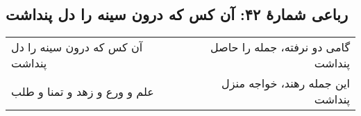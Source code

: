 \begin{center}
\section*{رباعی شمارهٔ ۴۲: آن کس که درون سینه را دل پنداشت}
\label{sec:042}
\begin{longtable}{l p{0.5cm} r}
آن کس که درون سینه را دل پنداشت
&&
گامی دو نرفته، جمله را حاصل پنداشت
\\
علم و ورع و زهد و تمنا و طلب
&&
این جمله رهند، خواجه منزل پنداشت
\\
\end{longtable}
\end{center}
